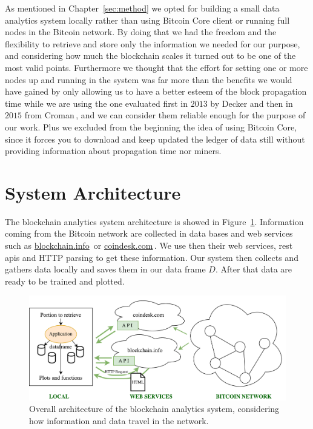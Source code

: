 \documentclass[USenglish]{uit-thesis}
\begin{document}
As mentioned in Chapter~\ref{sec:method} we opted for
building a small data analytics system locally rather than
using Bitcoin Core client or running full nodes
in the Bitcoin network. By doing that we had the
freedom and the flexibility to retrieve and store
only the information we needed for our purpose,
and considering how much the blockchain scales it
turned out to be one of the most valid points. Furthermore
we thought that the effort for setting one or more
nodes up and running in the system was far more
than the benefits we would have gained by only allowing us
to have a better esteem of the block propagation time
while we are using the one evaluated first in $2013$ by
Decker and then in $2015$
from Croman\,\cite{Decker2013IPBN, croman2016}, and
we can consider them reliable enough for
the purpose of our work. Plus we excluded
from the beginning the idea of using Bitcoin Core,
since it forces you to download and keep updated
the ledger of data still without providing information
about propagation time nor miners.

\section{System Architecture}
\label{sec:implementation}
The blockchain analytics system architecture
is showed in Figure~\ref{fig:architecture}.
Information coming from the Bitcoin network
are collected in data bases and web services such as
\url{blockchain.info}\,\cite{bitcoin_blockchain}
or \url{coindesk.com}\,\cite{coindesk}.
We use then their web services, \gls{rest} \gls{api}s and
HTTP parsing to get these information.
Our system then
collects and gathers data locally and saves them
in our data frame $D$. After that data are
ready to be trained and plotted.
\begin{figure}[h]
	\centering
	\includegraphics[width=1\textwidth]{img/architecture}
	\caption{Overall architecture of the blockchain analytics system, considering how information
		and data travel in the network.}
	\label{fig:architecture}
\end{figure}
\end{document}
